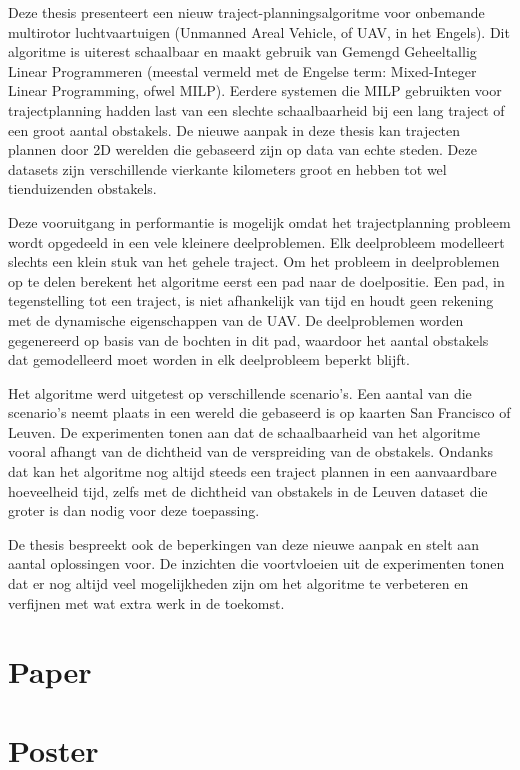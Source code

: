 \documentclass[
master=cws,
masteroption=ai,
english,
]{kulemt}
\begin{document}
\begin{abstract*}
Deze thesis presenteert een nieuw traject-planningsalgoritme voor onbemande multirotor luchtvaartuigen (Unmanned Areal Vehicle, of UAV, in het Engels). Dit algoritme is uiterest schaalbaar en maakt gebruik van Gemengd  Geheeltallig Linear Programmeren (meestal vermeld met de Engelse term: Mixed-Integer Linear Programming, ofwel MILP). Eerdere systemen die MILP gebruikten voor trajectplanning hadden last van een slechte schaalbaarheid bij een lang traject of een groot aantal obstakels. De nieuwe aanpak in deze thesis kan trajecten plannen door 2D werelden die gebaseerd zijn op data van echte steden. Deze datasets zijn verschillende vierkante kilometers groot en hebben tot wel tienduizenden obstakels.
\par
Deze vooruitgang in performantie is mogelijk omdat het trajectplanning probleem wordt opgedeeld in een vele kleinere deelproblemen. Elk deelprobleem modelleert slechts een klein stuk van het gehele traject. Om het probleem in deelproblemen op te delen berekent het algoritme eerst een pad naar de doelpositie. Een pad, in tegenstelling tot een traject, is niet afhankelijk van tijd en houdt geen rekening met de dynamische eigenschappen van de UAV. De deelproblemen worden gegenereerd op basis van de bochten in dit pad, waardoor het aantal obstakels dat gemodelleerd moet worden in elk deelprobleem beperkt blijft.
\par
Het algoritme werd uitgetest op verschillende scenario's. Een aantal van die scenario's neemt plaats in een wereld die gebaseerd is op kaarten San Francisco of Leuven. De experimenten tonen aan dat de schaalbaarheid van het algoritme vooral afhangt van de dichtheid van de verspreiding van de obstakels. Ondanks dat kan het algoritme nog altijd steeds een traject plannen in een aanvaardbare hoeveelheid tijd, zelfs met de dichtheid van obstakels in de Leuven dataset die groter is dan nodig voor deze toepassing.
\par
De thesis bespreekt ook de beperkingen van deze nieuwe aanpak en stelt aan aantal oplossingen voor. De inzichten die voortvloeien uit de experimenten tonen dat er nog altijd veel mogelijkheden zijn om het algoritme te verbeteren en verfijnen met wat extra werk in de toekomst.
\end{abstract*}

\listoffigures
\listoftables

\mainmatter

\clearpage

\clearpage

\clearpage

\clearpage

\clearpage

\clearpage
%

\clearpage

\appendixpage*
\appendix
\chapter{Paper}

\chapter{Poster}


\backmatter



\end{document}
